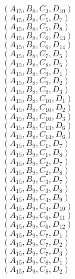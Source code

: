\documentclass[14pt]{article}
\begin{document}
    $({A}_{15}, {B}_{8}, {C}_{3}, {D}_{10}) $ \\ 
    $({A}_{15}, {B}_{8}, {C}_{5}, {D}_{7}) $ \\ 
    $({A}_{15}, {B}_{8}, {C}_{5}, {D}_{8}) $ \\ 
    $({A}_{15}, {B}_{8}, {C}_{6}, {D}_{13}) $ \\ 
    $({A}_{15}, {B}_{8}, {C}_{6}, {D}_{14}) $ \\ 
    $({A}_{15}, {B}_{8}, {C}_{7}, {D}_{5}) $ \\ 
    $({A}_{15}, {B}_{8}, {C}_{8}, {D}_{5}) $ \\ 
    $({A}_{15}, {B}_{8}, {C}_{9}, {D}_{1}) $ \\ 
    $({A}_{15}, {B}_{8}, {C}_{9}, {D}_{2}) $ \\ 
    $({A}_{15}, {B}_{8}, {C}_{9}, {D}_{3}) $ \\ 
    $({A}_{15}, {B}_{8}, {C}_{10}, {D}_{1}) $ \\ 
    $({A}_{15}, {B}_{8}, {C}_{10}, {D}_{2}) $ \\ 
    $({A}_{15}, {B}_{8}, {C}_{10}, {D}_{3}) $ \\ 
    $({A}_{15}, {B}_{8}, {C}_{13}, {D}_{6}) $ \\ 
    $({A}_{15}, {B}_{8}, {C}_{14}, {D}_{6}) $ \\ 
    $({A}_{15}, {B}_{9}, {C}_{1}, {D}_{7}) $ \\ 
    $({A}_{15}, {B}_{9}, {C}_{1}, {D}_{8}) $ \\ 
    $({A}_{15}, {B}_{9}, {C}_{2}, {D}_{7}) $ \\ 
    $({A}_{15}, {B}_{9}, {C}_{2}, {D}_{8}) $ \\ 
    $({A}_{15}, {B}_{9}, {C}_{3}, {D}_{7}) $ \\ 
    $({A}_{15}, {B}_{9}, {C}_{3}, {D}_{8}) $ \\ 
    $({A}_{15}, {B}_{9}, {C}_{4}, {D}_{9}) $ \\ 
    $({A}_{15}, {B}_{9}, {C}_{4}, {D}_{10}) $ \\ 
    $({A}_{15}, {B}_{9}, {C}_{6}, {D}_{11}) $ \\ 
    $({A}_{15}, {B}_{9}, {C}_{6}, {D}_{12}) $ \\ 
    $({A}_{15}, {B}_{9}, {C}_{7}, {D}_{1}) $ \\ 
    $({A}_{15}, {B}_{9}, {C}_{7}, {D}_{2}) $ \\ 
    $({A}_{15}, {B}_{9}, {C}_{7}, {D}_{3}) $ \\ 
    $({A}_{15}, {B}_{9}, {C}_{8}, {D}_{1}) $ \\ 
    $({A}_{15}, {B}_{9}, {C}_{8}, {D}_{2}) $ \\ 
\end{document}
